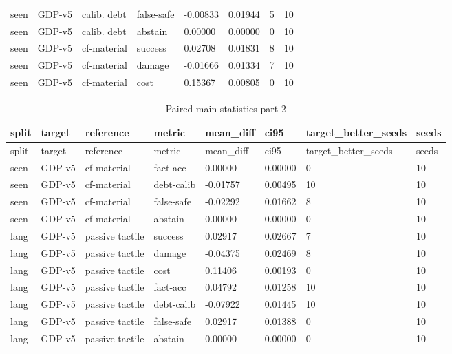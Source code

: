 \documentclass{article}
\begin{document}
\begin{center}
\begin{longtable}{llllllll}
seen & GDP-v5 & calib. debt & false-safe & -0.00833 & 0.01944 & 5 & 10 \\
seen & GDP-v5 & calib. debt & abstain & 0.00000 & 0.00000 & 0 & 10 \\
seen & GDP-v5 & cf-material & success & 0.02708 & 0.01831 & 8 & 10 \\
seen & GDP-v5 & cf-material & damage & -0.01666 & 0.01334 & 7 & 10 \\
seen & GDP-v5 & cf-material & cost & 0.15367 & 0.00805 & 0 & 10 \\
\bottomrule
\end{longtable}
\renewcommand{\arraystretch}{1.0}
\end{center}


\begin{center}
\tiny
\renewcommand{\arraystretch}{0.92}
\setlength{\tabcolsep}{3pt}
\begin{longtable}{llllllll}
\caption{Paired main statistics part 2}\label{tab:paired-main-statistics-2}\\
\toprule
split & target & reference & metric & mean\_diff & ci95 & target\_better\_seeds & seeds \\
\midrule
\endfirsthead
\toprule
split & target & reference & metric & mean\_diff & ci95 & target\_better\_seeds & seeds \\
\midrule
\endhead
seen & GDP-v5 & cf-material & fact-acc & 0.00000 & 0.00000 & 0 & 10 \\
seen & GDP-v5 & cf-material & debt-calib & -0.01757 & 0.00495 & 10 & 10 \\
seen & GDP-v5 & cf-material & false-safe & -0.02292 & 0.01662 & 8 & 10 \\
seen & GDP-v5 & cf-material & abstain & 0.00000 & 0.00000 & 0 & 10 \\
lang & GDP-v5 & passive tactile & success & 0.02917 & 0.02667 & 7 & 10 \\
lang & GDP-v5 & passive tactile & damage & -0.04375 & 0.02469 & 8 & 10 \\
lang & GDP-v5 & passive tactile & cost & 0.11406 & 0.00193 & 0 & 10 \\
lang & GDP-v5 & passive tactile & fact-acc & 0.04792 & 0.01258 & 10 & 10 \\
lang & GDP-v5 & passive tactile & debt-calib & -0.07922 & 0.01445 & 10 & 10 \\
lang & GDP-v5 & passive tactile & false-safe & 0.02917 & 0.01388 & 0 & 10 \\
lang & GDP-v5 & passive tactile & abstain & 0.00000 & 0.00000 & 0 & 10 \\

\end{longtable}
\end{center}
\end{document}
